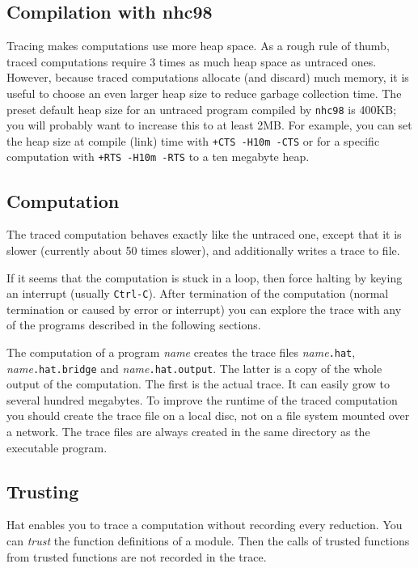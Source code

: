 \documentclass[12pt]{article}
\begin{document}
\subsection{Compilation with nhc98}

Tracing makes computations use more heap space. As a rough rule of
thumb, traced computations require 3 times as much heap space as
untraced ones. However, because traced computations allocate (and
discard) much memory, it is useful to choose an even larger heap size
to reduce garbage collection time.  The preset default heap size for
an untraced program compiled by \texttt{nhc98} is 400KB; you will
probably want to increase this to at least 2MB.  For example, you can
set the heap size at compile (link) time with \texttt{+CTS -H10m -CTS}
or for a specific computation with \texttt{+RTS -H10m -RTS} to a ten
megabyte heap.

\subsection{Computation}

The traced computation behaves exactly like the untraced one, except
that it is slower (currently about 50 times slower), 
and additionally writes a trace to file.

If it seems that the computation is stuck in a loop, then force halting
by keying an interrupt (usually \texttt{Ctrl-C}).  After termination of
the computation (normal termination or caused by error or interrupt)
you can explore the trace with any of the programs described in the
following sections.

The computation of a program \emph{name} creates the trace files
\emph{name}\texttt{.hat}, \emph{name}\texttt{.hat.bridge} and
\emph{name}\texttt{.hat.output}. The latter is a copy of the whole
output of the computation. The first is the actual trace. It can
easily grow to several hundred megabytes. To improve the runtime of
the traced computation you should create the trace file on a local
disc, not on a file system mounted over a network. The trace files
are always created in the same directory as the executable program.


\subsection{Trusting}\label{trusting}

Hat enables you to trace a computation without recording every
reduction.  You can \emph{trust} the function definitions of a
module. Then the calls of trusted functions from trusted functions
are not recorded in the trace.
\end{document}
